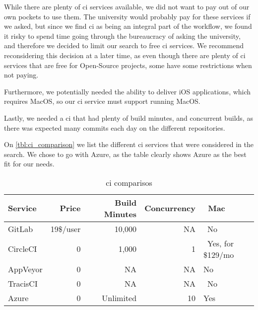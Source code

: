 While there are plenty of \gls{ci} services available, we did not want to pay out of our own pockets to use them. The university would probably pay for these services if we asked, but since we find \gls{ci} as being an integral part of the workflow, we found it risky to spend time going through the bureaucracy of asking the university, and therefore we decided to limit our search to free \gls{ci} services. We recommend reconsidering this decision at a later time, as even though there are plenty of \gls{ci} services that are free for Open-Source projects, some have some restrictions when not paying.

Furthermore, we potentially needed the ability to deliver iOS applications, which requires MacOS, so our \gls{ci} service must support running MacOS. 

Lastly, we needed a \gls{ci} that had plenty of build minutes, and concurrent builds, as there was expected many commits each day on the different repositories.

On \autoref{tbl:ci_comparison} we list the different \gls{ci} services that were considered in the search. We chose to go with Azure, as the table clearly shows Azure as the best fit for our needs.

\noindent\begin{longtable}[]{@{}lrrrl@{}}
    \caption{\gls{ci} comparisos}
    \label{tbl:ci_comparison}\\
    \toprule
    Service & Price & ~Build Minutes & Concurrency & ~Mac\tabularnewline
    \midrule
    \endhead
    GitLab & 19\$/user & 10,000 & NA & ~No\tabularnewline
    CircleCI & 0 & 1,000 & 1 & ~Yes, for \$129/mo\tabularnewline
    AppVeyor & 0 & ~ NA & NA & No\tabularnewline
    TracisCI & ~ 0 & ~ NA & ~ NA & ~No ~\tabularnewline
    Azure & 0 & ~ Unlimited & ~10 & Yes\tabularnewline
    \bottomrule
\end{longtable}
